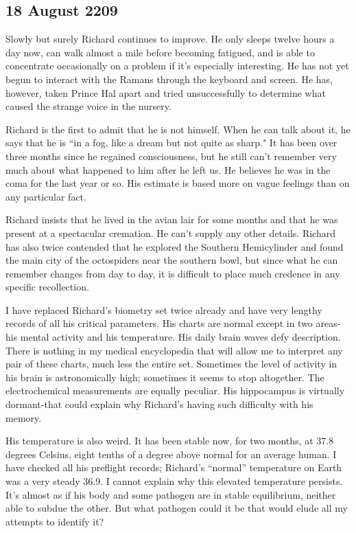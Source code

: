\documentclass[]{article}
\begin{document}
{\subsection*{18 August 2209}

Slowly but surely Richard continues to improve.  He only sleeps twelve hours a day now, can walk almost a mile before becoming fatigued, and is able to concentrate occasionally on a problem if it’s especially interesting.  He has not yet begun to interact with the Ramans through the keyboard and screen.  He has, however, taken Prince Hal apart and tried unsuccessfully to determine what caused the strange voice in the nursery.

Richard is the first to admit that he is not himself.  When he can talk about it, he says that he is “in a fog, like a dream but not quite as sharp."  It has been over three months since he regained consciousness, but he still can’t remember very much about what happened to him after he left us.  He believes he was in the coma for the last year or so.  His estimate is based more on vague feelings than on any particular fact.

Richard insists that he lived in the avian lair for some months and that he was present at a spectacular cremation.  He can’t supply any other details.  Richard has also twice contended that he explored the Southern Hemicylinder and found the main city of the octospiders near the southern bowl, but since what he can remember changes from day to day, it is difficult to place much credence in any specific recollection.

I have replaced Richard’s biometry set twice already and have very lengthy records of all his critical parameters.  His charts are normal except in two areas-his mental activity and his temperature.  His daily brain waves defy description.  There is nothing in my medical encyclopedia that will allow me to interpret any pair of these charts, much less the entire set.  Sometimes the level of activity in his brain is astronomically high; sometimes it seems to stop altogether.  The electrochemical measurements are equally peculiar.  His hippocampus is virtually dormant-that could explain why Richard’s having such difficulty with his memory.

His temperature is also weird.  It has been stable now, for two months, at 37.8 degrees Celsius, eight tenths of a degree above normal for an average human.  I have checked all his preflight records; Richard’s “normal” temperature on Earth was a very steady 36.9.  I cannot explain why this elevated temperature persists.  It’s almost as if his body and some pathogen are in stable equilibrium, neither able to subdue the other.  But what pathogen could it be that would elude all my attempts to identify it?

}
\end{document}

